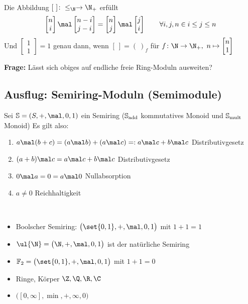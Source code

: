 \begin{bemerkungnr}
\begin{align*}
	\end{align*}
	Die Abbildung $[~]\colon\leq_\N\to\N_+$ erfüllt
	\begin{align*}
		\begin{bmatrix}
			n\\
			i
		\end{bmatrix}\mal
		\begin{bmatrix}
			n-i\\
			j-i
		\end{bmatrix}=\begin{bmatrix}
			n\\
			j
		\end{bmatrix}\mal
		\begin{bmatrix}
			j\\
			i
		\end{bmatrix}\qquad\forall i,j,n\in\mit i\leq j\leq n
	\end{align*}
	Und $\begin{bmatrix}
		1\\
		1
	\end{bmatrix}=1$ genau dann, wenn $[~]=(~)_f$ für $f\colon\N\to\N_+,~n\mapsto\begin{bmatrix}
		n\\
		1
	\end{bmatrix}$
\end{bemerkungnr}

\textbf{Frage:} Lässt sich obiges auf endliche freie Ring-Moduln ausweiten?

\subsection{Ausflug: Semiring-Moduln (Semimodule)}
Sei $\S=(S,+,\mal,0,1)$ ein Semiring ($\mathbb{S}_{\operatorname{add}}$ kommutatives Monoid und $\mathbb{S}_{\operatorname{mult}}$ Monoid)
Es gilt also:
\begin{enumerate}
	\item $a\mal(b+c)=(a\mal b)+(a\mal c)=:a\mal c+b\mal c$ Distributivgesetz
	\item $(a+b)\mal c=a\mal c+b\mal c$ Distributivgesetz
	\item $0\mal a=0=a\mal 0$ Nullabsorption
	\item $a\neq 0$ Reichhaltigkeit
\end{enumerate}

\begin{beispiel}\
	\begin{itemize}
		\item Boolscher Semiring: $\big(\set{0,1},+,\mal,0,1\big)$ mit $1+1=1$
		\item $\ul{\N}=\big(\N,+,\mal,0,1\big)$ ist der natürliche Semiring
		\item $\F_2=\big(\set{0,1},+,\mal,0,1\big)$ mit $1+1=0$
		\item Ringe, Körper $\Z,\Q,\R,\C$
		\item {} $\big([0,\infty],\min,+,\infty,0\big)$
	\end{itemize}
\end{beispiel}

